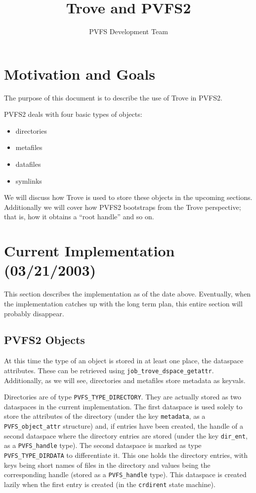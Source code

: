 \documentclass[10pt]{article} %
\title{Trove and PVFS2}
\author{PVFS Development Team}
\begin{document}
\maketitle

\section{Motivation and Goals}

The purpose of this document is to describe the use of Trove in PVFS2.

PVFS2 deals with four basic types of objects:
\begin{itemize}
\item directories
\item metafiles
\item datafiles
\item symlinks
\end{itemize}

We will discuss how Trove is used to store these objects in the upcoming
sections.  Additionally we will cover how PVFS2 bootstraps from the Trove
perspective; that is, how it obtains a ``root handle'' and so on.

\section{Current Implementation (03/21/2003)}

This section describes the implementation as of the date above.  Eventually,
when the implementation catches up with the long term plan, this entire
section will probably disappear.

\subsection{PVFS2 Objects}

At this time the type of an object is stored in at least one place, the
dataspace attributes.  These can be retrieved using
\texttt{job\_trove\_dspace\_getattr}.  Additionally, as we will see,
directories and metafiles store metadata as keyvals.

Directories are of type \texttt{PVFS\_TYPE\_DIRECTORY}.  They are actually
stored as two dataspaces in the current implementation.
%
The first dataspace is used solely to store the attributes of the directory
(under the key \texttt{metadata}, as a \texttt{PVFS\_object\_attr} structure)
and, if entries have been created, the handle of a second dataspace where the
directory entries are stored (under the key \texttt{dir\_ent}, as a
\texttt{PVFS\_handle} type).
%
The second dataspace is marked as type \texttt{PVFS\_TYPE\_DIRDATA} to
differentiate it.  This one holds the directory entries, with keys being
short names of files in the directory and values being the corresponding handle
(stored as a \texttt{PVFS\_handle} type).  This dataspace is created lazily
when the first entry is created (in the \texttt{crdirent} state machine).
\end{document}
